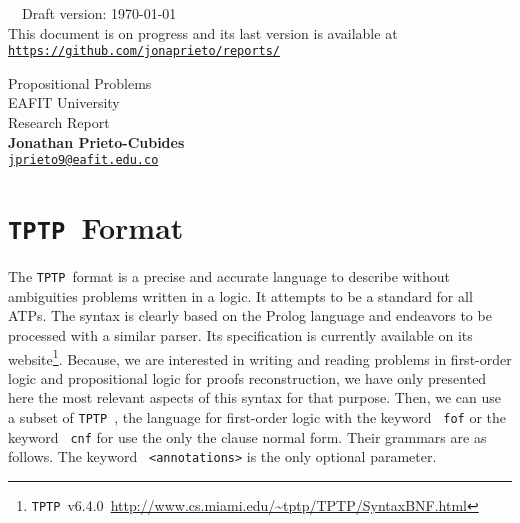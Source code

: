\documentclass[11pt]{article}
\newcommand{\agda}[0]{\texttt{Agda}\,}
\newcommand{\tptp}[0]{\texorpdfstring{\texttt{TPTP}}\ \ }
\newcommand{\ttgray}[1]{\texttt{\color{gray} #1}}
\begin{document}

\hrulefill\ \ Draft version: \today\\
{\small
This document is on progress and its last version is available at
\href{https://github.com/jonaprieto/tstp2agda}{{\color{blue(munsell)}
\texttt{https://github.com/jonaprieto/reports/}}}
}

\vspace{3mm}
\begin{center}
{\Large Propositional Problems}\\
{\large EAFIT University}\\[2.2mm]
Research Report\\
\textbf{Jonathan Prieto-Cubides}\\ %
\href{mailto:jprieto9@eafit.edu.co}{{\color{blue(munsell)}\texttt{jprieto9@eafit.edu.co}}}
\end{center}
\vspace{0.1 cm}



\section{\tptp Format}

The \tptp format is a precise and accurate language to describe without ambiguities problems written in a logic. It attempts to be a standard for all ATPs. The syntax is clearly based on the Prolog language and endeavors to be processed with a similar parser. Its specification is currently available on its website\footnote{\tptp v6.4.0~\url{http://www.cs.miami.edu/~tptp/TPTP/SyntaxBNF.html}}.
Because, we are interested in writing and reading problems in first-order logic and propositional logic for proofs reconstruction, we have only presented here the most relevant aspects of this syntax for that purpose. Then, we can use a subset of \tptp, the language for first-order logic with the keyword \ttgray{fof} or the keyword \ttgray{cnf} for use the only the clause normal form. Their grammars are as follows. The keyword \ttgray{<annotations>} is the only optional parameter.
\end{document}
